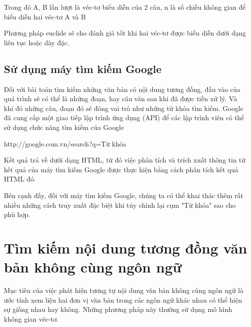\documentclass[12pt]{report}
\begin{document}
\hspace{20mm} Trong đó A, B lần lượt là véc-tơ biểu diễn của 2 câu, 
n là số chiều không gian để biểu diễn hai véc-tơ A và B

\hspace{20mm} Phương pháp euclide sẽ cho đánh giá tốt khi hai véc-tơ được biểu diễn dưới dạng liên tục hoặc dày đặc.

\subsection{Sử dụng máy tìm kiếm Google}

Đối với bài toán tìm kiếm những văn bản có nội dung tương đồng, đầu vào của quá trình sẽ có thể là những đoạn, hay câu văn sau khi đã được tiền xử lý. Và khi đó những câu, đoạn đó sẽ đóng vai trò như những từ khóa tìm kiếm. Google đã cung cấp một giao tiếp lập trình ứng dụng (API) để các lập trình viên có thể sử dụng chức năng tìm kiếm của Google
\begin{center}
	http://google.com.vn/search?q=Từ khóa
\end{center}

Kết quả trả về dưới dạng HTML, từ đó việc phân tích và trích xuất thông tin từ kết quả của máy tìm kiếm Google được thực hiện bằng cách phân tích kết quả HTML đó. 

Bên cạnh đấy, đối với máy tìm kiếm Google, chúng ta có thể khai thác thêm rất nhiều những cách truy xuất đặc biệt khi tủy chỉnh lại cụm "Từ khóa" sao cho phù hợp.

\section{Tìm kiếm nội dung tương đồng văn bản không cùng ngôn ngữ}

Mục tiêu của việc phát hiện tương tự nội dung văn bản không cùng ngôn ngữ là ước tính xem liệu hai đơn vị văn bản trong các ngôn ngữ khác nhau có thể hiện sự giống nhau hay không. Những phương pháp này thường sử dụng mô hình không gian véc-tơ.
\end{document}
